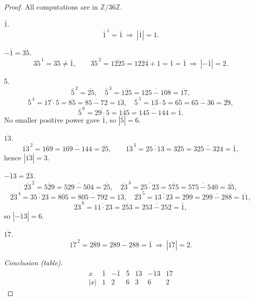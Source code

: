 \documentclass[12pt]{article}
\theoremstyle{definition}
\begin{document}
\dotfill

\begin{proof}
All computations are in $\mathbb{Z}/36\mathbb{Z}$.

\dotfill

\noindent\emph{$\bar 1$.}
\[
\bar 1^{\,1}=\bar 1 \ \Rightarrow\ |\bar 1|=1.
\]

\dotfill

\noindent\emph{$-\bar 1=\overline{35}$.}
\[
\overline{35}^{\,1}=\overline{35}\neq\bar 1,\qquad
\overline{35}^{\,2}=\overline{1225}=\overline{1224+1}=\overline{1}=\bar 1
\ \Rightarrow\ |-\bar 1|=2.
\]

\dotfill

\noindent\emph{$\bar 5$.}
\[
\bar 5^{\,2}=\overline{25},\quad
\bar 5^{\,3}=\overline{125}=\overline{125-108}=\overline{17},
\]
\[
\bar 5^{\,4}=\overline{17\cdot 5}=\overline{85}=\overline{85-72}=\overline{13},\quad
\bar 5^{\,5}=\overline{13\cdot 5}=\overline{65}=\overline{65-36}=\overline{29},
\]
\[
\bar 5^{\,6}=\overline{29\cdot 5}=\overline{145}=\overline{145-144}=\bar 1.
\]
No smaller positive power gave $\bar 1$, so $|\bar 5|=6$.

\dotfill

\noindent\emph{$\overline{13}$.}
\[
\overline{13}^{\,2}=\overline{169}=\overline{169-144}=\overline{25},\qquad
\overline{13}^{\,3}=\overline{25\cdot 13}=\overline{325}=\overline{325-324}=\bar 1,
\]
hence $|\overline{13}|=3$.

\dotfill

\noindent\emph{$\overline{-13}=\overline{23}$.}
\[
\overline{23}^{\,2}=\overline{529}=\overline{529-504}=\overline{25},\quad
\overline{23}^{\,3}=\overline{25\cdot 23}=\overline{575}=\overline{575-540}=\overline{35},
\]
\[
\overline{23}^{\,4}=\overline{35\cdot 23}=\overline{805}=\overline{805-792}=\overline{13},\quad
\overline{23}^{\,5}=\overline{13\cdot 23}=\overline{299}=\overline{299-288}=\overline{11},
\]
\[
\overline{23}^{\,6}=\overline{11\cdot 23}=\overline{253}=\overline{253-252}=\bar 1,
\]
so $|\overline{-13}|=6$.

\dotfill

\noindent\emph{$\overline{17}$.}
\[
\overline{17}^{\,2}=\overline{289}=\overline{289-288}=\bar 1
\ \Rightarrow\ |\overline{17}|=2.
\]

\dotfill

\noindent\emph{Conclusion (table).}
\[
\begin{array}{c|cccccc}
x & \bar 1 & -\bar 1 & \bar 5 & \overline{13} & \overline{-13} & \overline{17} \\
\hline
|x| & 1 & 2 & 6 & 3 & 6 & 2
\end{array}
\]
\end{proof}
\end{document}
